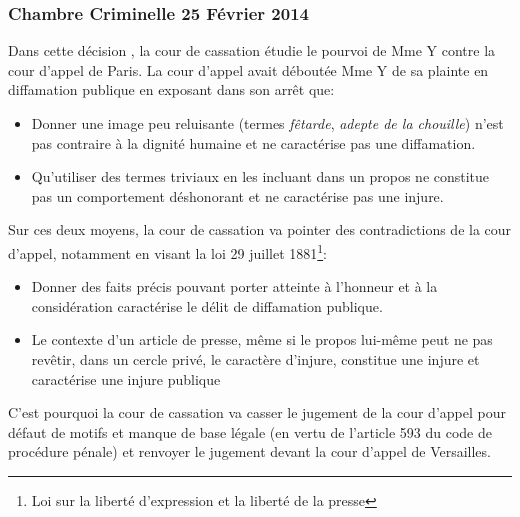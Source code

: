 \documentclass[math]{cours}
\begin{document}
\subsubsection{Chambre Criminelle 25 Février 2014}
Dans cette décision \cite{CassCrim25022014}, la cour de cassation étudie le pourvoi de Mme Y contre la cour d'appel de Paris.
La cour d'appel avait déboutée Mme Y de sa plainte en diffamation publique en exposant dans son arrêt que:
\begin{itemize}
	\item Donner une image peu reluisante (termes \textit{fêtarde}, \textit{adepte de la chouille}) n'est pas contraire à la dignité humaine et ne caractérise pas une diffamation.
	\item Qu'utiliser des termes triviaux en les incluant dans un propos ne constitue pas un comportement déshonorant et ne caractérise pas une injure.
\end{itemize}
Sur ces deux moyens, la cour de cassation va pointer des contradictions de la cour d'appel, notamment en visant la loi 29 juillet 1881\footnote{Loi sur la liberté d'expression et la liberté de la presse}:
\begin{itemize}
	\item Donner des faits précis pouvant porter atteinte à l'honneur et à la considération caractérise le délit de diffamation publique.
	\item Le contexte d'un article de presse, même si le propos lui-même peut ne pas revêtir, dans un cercle privé, le caractère d'injure, constitue une injure et caractérise une injure publique
\end{itemize}
C'est pourquoi la cour de cassation va casser le jugement de la cour d'appel pour défaut de motifs et manque de base légale (en vertu de l'article 593 du code de procédure pénale) et renvoyer le jugement devant la cour d'appel de Versailles.
\end{document}
